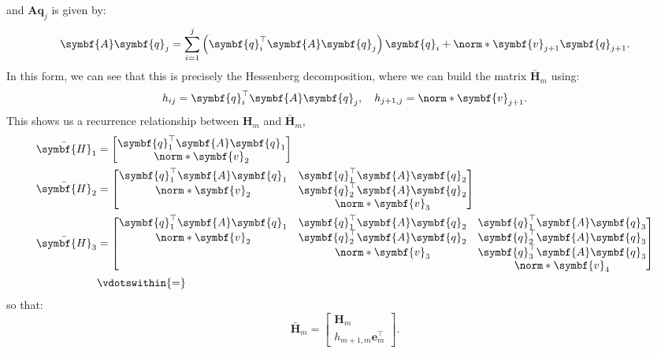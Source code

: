 \documentclass{article}
\begin{document}
and \(\symbf{A}\symbf{q}_j\) is given by:
\begin{equation*}
    \symbf{A} \symbf{q}_j = \sum_{i=1}^j \left( \symbf{q}_i^\top \symbf{A} \symbf{q}_j \right) \symbf{q}_i + \norm*{\symbf{v}_{j+1}} \symbf{q}_{j+1}.
\end{equation*}
In this form, we can see that this is precisely the Hessenberg
decomposition, where we can build the matrix \(\bar{\symbf{H}}_m\) using:
\begin{equation*}
    h_{ij} = \symbf{q}_i^\top \symbf{A} \symbf{q}_j, \quad h_{j+1,j} = \norm*{\symbf{v}_{j+1}}.
\end{equation*}
This shows us a recurrence relationship between \(\symbf{H}_m\) and
\(\bar{\symbf{H}}_m\),
\begin{align*}
    \bar{\symbf{H}}_1 & =
    \begin{bmatrix}
        \symbf{q}_1^\top \symbf{A} \symbf{q}_1 \\
        \norm*{\symbf{v}_2}
    \end{bmatrix}
    \\
    \bar{\symbf{H}}_2 & =
    \begin{bmatrix}
        \symbf{q}_1^\top \symbf{A} \symbf{q}_1 & \symbf{q}_1^\top \symbf{A} \symbf{q}_2 \\
        \norm*{\symbf{v}_2}                    & \symbf{q}_2^\top \symbf{A} \symbf{q}_2 \\
                                               & \norm*{\symbf{v}_3}
    \end{bmatrix}
    \\
    \bar{\symbf{H}}_3 & =
    \begin{bmatrix}
        \symbf{q}_1^\top \symbf{A} \symbf{q}_1 & \symbf{q}_1^\top \symbf{A} \symbf{q}_2 & \symbf{q}_1^\top \symbf{A} \symbf{q}_3 \\
        \norm*{\symbf{v}_2}                    & \symbf{q}_2^\top \symbf{A} \symbf{q}_2 & \symbf{q}_2^\top \symbf{A} \symbf{q}_3 \\
                                               & \norm*{\symbf{v}_3}                    & \symbf{q}_3^\top \symbf{A} \symbf{q}_3 \\
                                               &                                        & \norm*{\symbf{v}_4}
    \end{bmatrix}
    \\
                      & \vdotswithin{=}
\end{align*}
so that:
\begin{equation*}
    \bar{\symbf{H}}_m =
    \begin{bmatrix}
        \symbf{H}_m \\
        h_{m+1,m} \symbf{e}_m^\top
    \end{bmatrix}
    .
\end{equation*}
\end{document}
